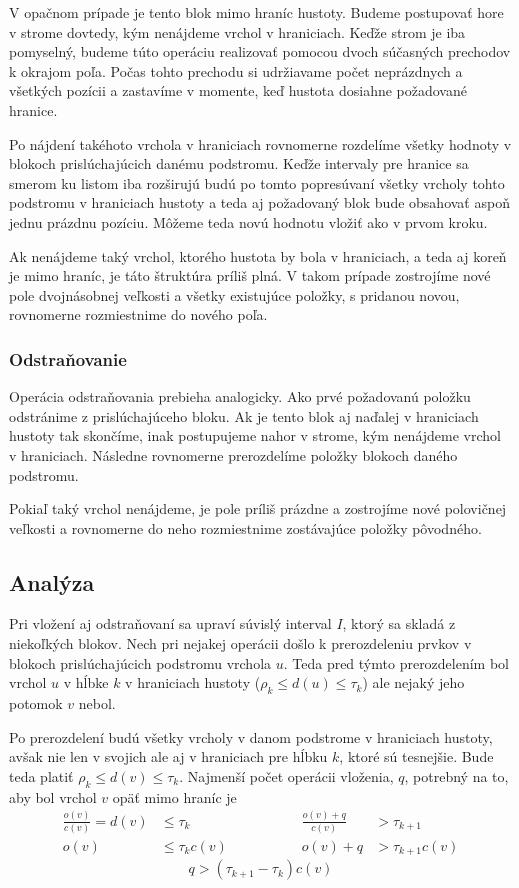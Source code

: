 V opačnom prípade je tento blok mimo hraníc hustoty. Budeme postupovať hore v strome dovtedy, kým nenájdeme vrchol v hraniciach. Keďže strom je iba pomyselný, budeme túto operáciu realizovať pomocou dvoch súčasných prechodov k okrajom poľa. Počas tohto prechodu si udržiavame počet neprázdnych a všetkých pozícii a zastavíme v momente, keď hustota dosiahne požadované hranice.

Po nájdení takéhoto vrchola v hraniciach rovnomerne rozdelíme všetky hodnoty v blokoch prislúchajúcich danému podstromu. Keďže intervaly pre hranice sa smerom ku listom iba rozširujú budú po tomto popresúvaní všetky vrcholy tohto podstromu v hraniciach hustoty a teda aj požadovaný blok bude obsahovať aspoň jednu prázdnu pozíciu. Môžeme teda novú hodnotu vložiť ako v prvom kroku.

Ak nenájdeme taký vrchol, ktorého hustota by bola v hraniciach, a teda aj koreň je mimo hraníc, je táto štruktúra príliš plná. V takom prípade zostrojíme nové pole dvojnásobnej veľkosti a všetky existujúce položky, s pridanou novou, rovnomerne rozmiestnime do nového poľa.

\subsubsection{Odstraňovanie}

Operácia odstraňovania prebieha analogicky. Ako prvé požadovanú položku odstránime z prislúchajúceho bloku. Ak je tento blok aj naďalej v hraniciach hustoty tak skončíme, inak postupujeme nahor v strome, kým nenájdeme vrchol v hraniciach. Následne rovnomerne prerozdelíme položky blokoch daného podstromu.

Pokiaľ taký vrchol nenájdeme, je pole príliš prázdne a zostrojíme nové polovičnej veľkosti a rovnomerne do neho rozmiestnime zostávajúce položky pôvodného.

\subsection{Analýza}

Pri vložení aj odstraňovaní sa upraví súvislý interval $I$, ktorý sa skladá z niekoľkých blokov. Nech pri nejakej operácii došlo k prerozdeleniu prvkov v blokoch prislúchajúcich podstromu vrchola $u$. Teda pred týmto prerozdelením bol vrchol $u$ v hĺbke $k$ v hraniciach hustoty ($\rho_k \le d(u) \le \tau_k$) ale nejaký jeho potomok $v$ nebol.

Po prerozdelení budú všetky vrcholy v danom podstrome v hraniciach hustoty, avšak nie len v svojich ale aj v hraniciach pre hĺbku $k$, ktoré sú tesnejšie. Bude teda platiť $\rho_k \le d(v) \le \tau_k$. Najmenší počet operácii vloženia, $q$, potrebný na to, aby bol vrchol $v$ opäť mimo hraníc je
\[
\begin{aligned}
\frac{o(v)}{c(v)} = d(v) &\le \tau_k \hspace{3cm} & \frac{o(v)+q}{c(v)} &> \tau_{k+1} \\
o(v) &\le \tau_k c(v) & o(v)+q &> \tau_{k+1}c(v)
\end{aligned}
\]\[
q > (\tau_{k+1}-\tau_k)c(v)
\]

